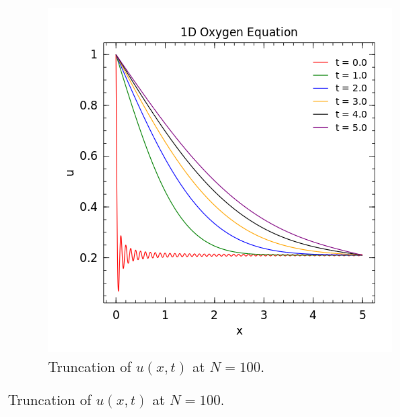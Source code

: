 \documentclass[12pt]{article}
\theoremstyle{remark}
\begin{document}
\begin{figure}[H]
\begin{subfigure}{.5\textwidth}
		\includegraphics[width=1\linewidth]{Q5_100.png}
		\caption*{Truncation of $u(x,t)$ at $N = 100$.}
		\label{fig:sub2}
	\end{subfigure}
	\label{fig:test}
\end{figure}
\end{document}
